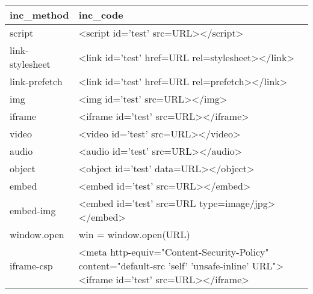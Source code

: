 \begin{tabular}{ll}
\toprule
      inc\_method &                                                                                                                          inc\_code \\
\midrule
          script &                                                                                               <script id='test' src=URL></script> \\
 link-stylesheet &                                                                                   <link id='test' href=URL rel=stylesheet></link> \\
   link-prefetch &                                                                                     <link id='test' href=URL rel=prefetch></link> \\
             img &                                                                                                     <img id='test' src=URL></img> \\
          iframe &                                                                                               <iframe id='test' src=URL></iframe> \\
           video &                                                                                                 <video id='test' src=URL></video> \\
           audio &                                                                                                 <audio id='test' src=URL></audio> \\
          object &                                                                                              <object id='test' data=URL></object> \\
           embed &                                                                                                 <embed id='test' src=URL></embed> \\
       embed-img &                                                                                  <embed id='test' src=URL type=image/jpg></embed> \\
     window.open &                                                                                                            win = window.open(URL) \\
      iframe-csp &  <meta http-equiv="Content-Security-Policy" content="default-src 'self' 'unsafe-inline' URL"> <iframe id='test' src=URL></iframe> \\
\bottomrule
\end{tabular}
